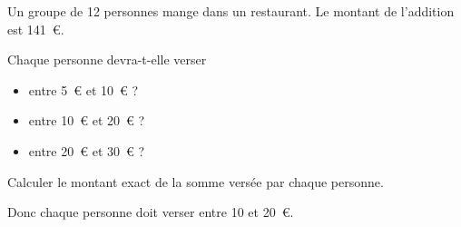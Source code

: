 \par Un groupe de 12 personnes mange dans un restaurant. Le montant de l'addition est 141~\textgreek{\euro}.
\begin{myenumerate}
  \item Chaque personne devra-t-elle verser
    \begin{itemize}
    \item entre 5~\textgreek{\euro} et 10~\textgreek{\euro} ?
    \item entre 10~\textgreek{\euro} et 20~\textgreek{\euro} ?
    \item entre 20~\textgreek{\euro} et 30~\textgreek{\euro} ?
    \end{itemize}
  \item Calculer le montant exact de la somme versée par chaque personne.
\end{myenumerate}
\begin{myenumerate}
  \item
    \begin{multicols}{4}
      \par
      \par
      \par
    \end{multicols}
Donc chaque personne doit verser entre 10 et 20~\textgreek{\euro}.
\item\subitem{}\par{}
\end{myenumerate}